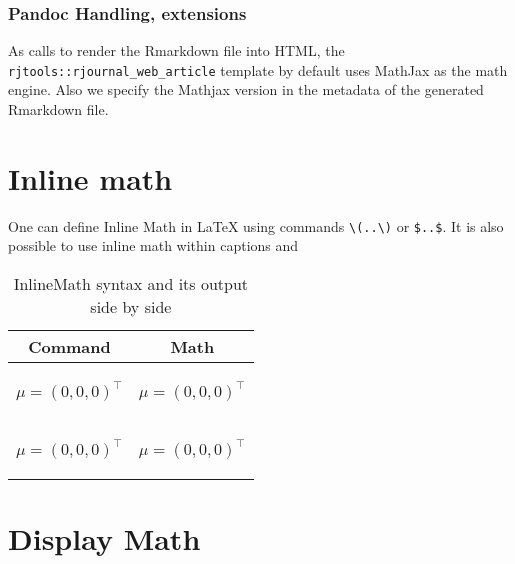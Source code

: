 \subsubsection{Pandoc Handling, extensions}
As  calls  to render the Rmarkdown file into HTML,
the \verb|rjtools::rjournal_web_article| template by default uses MathJax as the math engine. 
Also we specify the Mathjax version in the metadata of the generated Rmarkdown file.

\section{Inline math}
One can define Inline Math in LaTeX using commands \verb|\(..\)| or \verb|$..$|.
It is also possible to use inline math within captions and  
\begin{table}[htbp]
  \centering
  \begin{tabular}{| c | c |}
  \hline
  Command & Math\\
    \hline
    \begin{minipage}{0.45\textwidth}
\vspace{1mm}
\begin{example}
\(\mu = (0,0,0)^\top \)
\end{example}
    \end{minipage} &
    \begin{minipage}{0.45\textwidth}
    \centering
    \( \mu = (0,0,0)^\top \)
    \end{minipage}\\
    \hline
    
  \begin{minipage}{0.45\textwidth}
\vspace{1mm}
\begin{example}
$\mu = (0,0,0)^\top $
\end{example}
    \end{minipage} &
    \begin{minipage}{0.45\textwidth}
    \centering
    $ \mu = (0,0,0)^\top $
    \end{minipage}\\
    \hline
  \end{tabular}
  \caption{InlineMath syntax and its output side by side}
  \label{table:1}
\end{table}



\section{Display Math}

